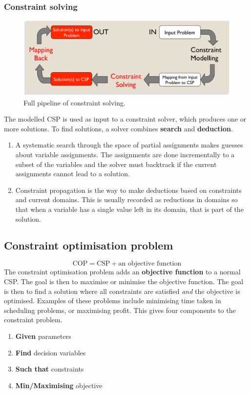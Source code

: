 \documentclass[CS4402-Notes.tex]{subfiles}
\begin{document}
\subsubsection{Constraint solving}
\begin{figure}[H]
\centering
\includegraphics[width=1\textwidth, keepaspectratio]{imgs/constraint-solving.png}
\caption{Full pipeline of constraint solving.}
\end{figure}
\noindent
The modelled CSP is used as input to a constraint solver, which produces one or more solutions. To find solutions, a solver combines \textbf{search} and \textbf{deduction}. 
\begin{enumerate}
\item A systematic search through the space of partial assignments makes guesses about variable assignments. The assignments are done incrementally to a subset of the variables and the solver must backtrack if the current assignments cannot lead to a solution.
\item Constraint propagation is the way to make deductions based on constraints and current domains. This is usually recorded as reductions in domains so that when a variable has a single value left in its domain, that is part of the solution. 
\end{enumerate} 

\subsection{Constraint optimisation problem}
\begin{equation}
\text{COP} = \text{CSP} + \text{an objective function}
\end{equation}
The constraint optimisation problem adds an \textbf{objective function} to a normal CSP. The goal is then to maximise or minimise the objective function. The goal is then to find a solution where all constraints are satisfied \textit{and} the objective is optimised. Examples of these problems include minimising time taken in scheduling problems, or maximising profit. This gives four components to the constraint problem.
\begin{enumerate}
\item \textbf{Given} parameters
\item \textbf{Find} decision variables
\item \textbf{Such that} constraints
\item \textbf{Min/Maximising} objective
\end{enumerate}
\end{document}
